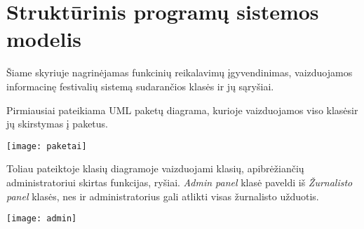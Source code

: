 ﻿\documentclass{VUMIFPSkursinis}
\begin{document}
\section{Struktūrinis programų sistemos modelis}
Šiame skyriuje nagrinėjamas funkcinių reikalavimų įgyvendinimas, vaizduojamos informacinę festivalių sistemą sudarančios klasės ir jų sąryšiai.

Pirmiausiai pateikiama UML paketų diagrama, kurioje vaizduojamos viso klasėsir jų skirstymas į paketus.
\begin{center}
    \texttt{[image: paketai]}
\end{center}

Toliau pateiktoje klasių diagramoje vaizduojami klasių, apibrėžiančių administratoriui skirtas funkcijas, ryšiai. \textit{Admin panel} klasė paveldi iš \textit{Žurnalisto panel} klasės, nes ir administratorius gali atlikti visas žurnalisto užduotis.
\begin{center}
    \texttt{[image: admin]}
\end{center}
\end{document}
